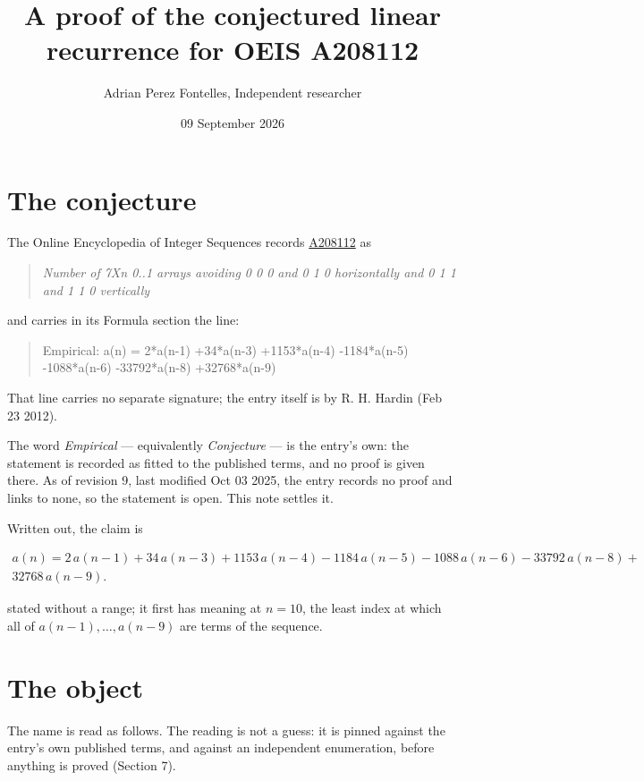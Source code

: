 \documentclass[11pt]{article}
\title{A proof of the conjectured linear recurrence for OEIS A208112}
\author{Adrian Perez Fontelles, Independent researcher}
\date{09 September 2026}
\theoremstyle{definition}
\begin{document}
\maketitle
\section{The conjecture}

The Online Encyclopedia of Integer Sequences records \href{https://oeis.org/A208112}{A208112} as

\begin{quote}\itshape Number of 7Xn 0..1 arrays avoiding 0 0 0 and 0 1 0 horizontally and 0 1 1 and 1 1 0 vertically\end{quote}

and carries in its Formula section the line:

\begin{quote}\ttfamily Empirical: a(n) = 2*a(n-1) +34*a(n-3) +1153*a(n-4) -1184*a(n-5) -1088*a(n-6) -33792*a(n-8) +32768*a(n-9)\end{quote}

That line carries no separate signature; the entry itself is by R. H. Hardin (Feb 23 2012).

The word {\itshape Empirical} --- equivalently {\itshape Conjecture} --- is the entry's own: the statement is recorded as fitted to the published terms, and no proof is given there. As of revision 9, last modified Oct 03 2025, the entry records no proof and links to none, so the statement is open. This note settles it.

Written out, the claim is

\begin{multline*} a(n) = 2\,a(n-1) + 34\,a(n-3) + 1153\,a(n-4) - 1184\,a(n-5) - 1088\,a(n-6) - 33792\,a(n-8) + \\ 32768\,a(n-9). \end{multline*}

stated without a range; it first has meaning at $n = 10$, the least index at which all of $a(n-1),\dots,a(n-9)$ are terms of the sequence.

\section{The object}

The name is read as follows. The reading is not a guess: it is pinned against the entry's own published terms, and against an independent enumeration, before anything is proved (Section 7).
\end{document}
